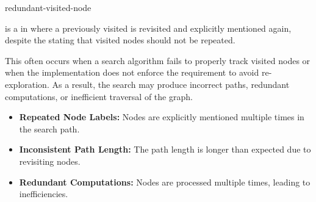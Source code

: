 \documentclass{stex}
\begin{document}
\begin{smodule}[title={Redundant Visited Node}]{redundant-visited-node}



\begin{sdefinition}
   is a  in    where a previously visited  is revisited and explicitly mentioned again, despite the  stating that visited nodes should not be repeated. 
\end{sdefinition}

\begin{sparagraph}
  This often occurs when a search algorithm fails to properly track visited nodes or when the implementation does not enforce the requirement to avoid re-exploration. As a result, the search may produce incorrect paths, redundant computations, or inefficient traversal of the graph.
\end{sparagraph}




\begin{sparagraph}[title=Diagnosis]
  \begin{itemize}
  \item \textbf{Repeated Node Labels:} Nodes are explicitly mentioned multiple times in the search path.
  \item \textbf{Inconsistent Path Length:} The path length is longer than expected due to revisiting nodes.
  \item \textbf{Redundant Computations:} Nodes are processed multiple times, leading to inefficiencies.
  \end{itemize}
\end{sparagraph}


\end{smodule}
\end{document}
